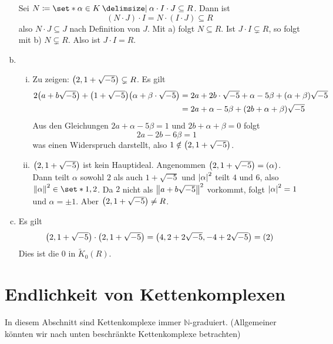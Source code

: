 \begin{beweis}
\begin{enumerate}[a)]
        Sei $N \coloneqq \set*{\alpha \in K \given \alpha \cdot I \cdot J \subseteq R}$.
        Dann ist
        \[
            (N \cdot J) \cdot I = N \cdot (I \cdot J) \subseteq R
        \]
        also $N \cdot J \subseteq J$ nach Definition von $J$.
        Mit a) folgt $N \subseteq R$.
        Ist $J \cdot I \subsetneq R$, so folgt mit b) $N \subsetneq R$.
        Also ist $J \cdot I =R$. 
        \item \begin{enumerate}[(i)]
            \item Zu zeigen: $\enbrace*{2, 1+ \sqrt{-5}} \subsetneq R$. Es gilt
            \begin{align}
                2 \enbrace*{a + b\sqrt{-5}} + \enbrace*{1 + \sqrt{-5}} \enbrace*{\alpha + \beta \cdot \sqrt{-5}} &= 2a + 2 b\cdot \sqrt{-5} + \alpha - 5 \beta +(\alpha +\beta) \sqrt{-5} \\
                &= 2 a + \alpha - 5 \beta + \enbrace*{2b + \alpha+ \beta} \sqrt{-5}
            \end{align}
            Aus den Gleichungen $2 a + \alpha - 5 \beta = 1$ und $2 b +\alpha + \beta=0$ folgt
            \[
                2a -2b -6 \beta =1
            \]
            was einen Widerspruch darstellt, also $1 \notin \enbrace*{2, 1+ \sqrt{-5}}$.
            \item $\enbrace*{2, 1+ \sqrt{-5}}$ ist kein Hauptideal.
            Angenommen $\enbrace*{2, 1+ \sqrt{-5}} = (\alpha)$.
            Dann teilt $\alpha$ sowohl $2$ als auch $1+ \sqrt{-5}$ und $\abs*{\alpha}^2$ teilt $4$ und $6$, also $\norm*{\alpha}^2 \in \set*{1,2}$.
            Da $2$ nicht als $\norm*{a + b \sqrt{-5}}^2$ vorkommt, folgt $\abs*{\alpha}^2=1$ und $\alpha = \pm 1$.
            Aber $\enbrace*{2, 1+ \sqrt{-5}} \neq R$.
        \end{enumerate}
        \item Es gilt
        \begin{align}
            \enbrace*{2, 1+ \sqrt{-5}} \cdot \enbrace*{2, 1+ \sqrt{-5}} = \enbrace*{4, 2 + 2 \sqrt{-5}, -4 + 2\sqrt{-5}} = (2) 
        \end{align}
        Dies ist die $0$ in $\tilde{K}_0(R)$.
        \qedhere
    \end{enumerate}
\end{beweis}

\newpage

\section{Endlichkeit von Kettenkomplexen} %
\label{sec:3}
In diesem Abschnitt sind Kettenkomplexe immer $\mathbb{N}$-graduiert. (Allgemeiner könnten wir nach unten beschränkte Kettenkomplexe betrachten)

